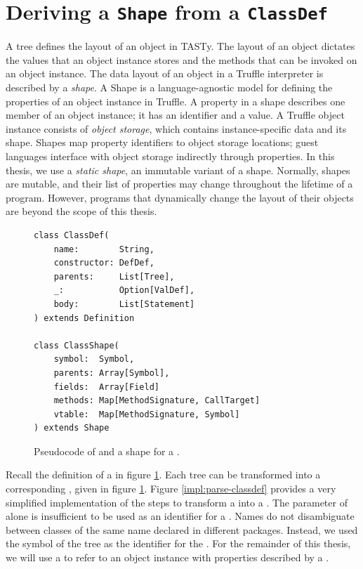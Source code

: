 \section{Deriving a \texttt{Shape} from a \texttt{ClassDef}}
\label{impl:subsection:classdef}

A  tree defines the layout of an object in TASTy.
The layout of an object dictates the values that an object instance stores and the methods that can be invoked on an object instance.
The data layout of an object in a Truffle interpreter is described by a \textit{shape}\cite{self:prototypes,truffle:object-model}.
A Shape is a language-agnostic model for defining the properties of an object instance in Truffle.
A property in a shape describes one member of an object instance; it has an identifier and a value.
A Truffle object instance consists of \textit{object storage}, which contains instance-specific data and its shape.
Shapes map property identifiers to object storage locations; guest languages interface with object storage indirectly through properties.
In this thesis, we use a \textit{static shape}, an immutable variant of a shape.
Normally, shapes are mutable, and their list of properties may change throughout the lifetime of a program\cite{truffleruby:object-model}.
However, programs that dynamically change the layout of their objects\cite{java:reflection} are beyond the scope of this thesis.

\begin{figure}[!htb]
\centering
\begin{verbatim}
class ClassDef(
	name:        String,
	constructor: DefDef, 
	parents:     List[Tree], 
	_:           Option[ValDef], 
	body:        List[Statement]
) extends Definition

class ClassShape(
	symbol:  Symbol,
	parents: Array[Symbol],
	fields:  Array[Field]
	methods: Map[MethodSignature, CallTarget]
	vtable:  Map[MethodSignature, Symbol]
) extends Shape
\end{verbatim}
\label{impl:classshape}
\caption{Pseudocode of  and a shape for a .}
\end{figure}

Recall the definition of a  in figure \ref{impl:classshape}.
Each  tree can be transformed into a corresponding , given in figure \ref{impl:classshape}.
Figure \ref{impl:parse-classdef} provides a very simplified implementation of the steps to transform a  into a .
The  parameter of  alone is insufficient to be used as an identifier for a .
Names do not disambiguate between classes of the same name declared in different packages.
Instead, we used the symbol of the  tree as the identifier for the .
For the remainder of this thesis, we will use a  to refer to an object instance with properties described by a .

